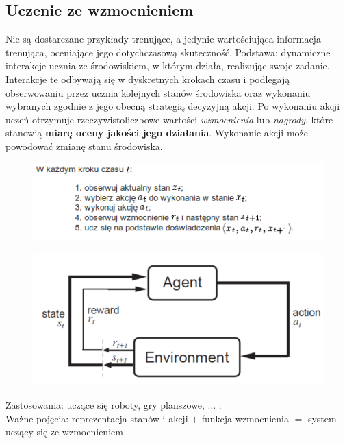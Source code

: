 \documentclass[10pt,a4paper]{article}
\begin{document}
\subsection{Uczenie ze wzmocnieniem}
Nie są dostarczane przykłady trenujące, a jedynie wartościująca informacja trenująca, oceniające jego dotychczasową skuteczność. Podstawa: dynamiczne interakcje ucznia ze środowiskiem, w którym działa, realizując swoje zadanie. Interakcje te odbywają się w dyskretnych krokach czasu i podlegają obserwowaniu przez ucznia kolejnych stanów środowiska oraz wykonaniu wybranych zgodnie z jego obecną strategią decyzyjną akcji. Po wykonaniu akcji uczeń otrzymuje rzeczywistoliczbowe wartości \textit{wzmocnienia} lub \textit{nagrody}, które stanowią \textbf{miarę oceny jakości jego działania}. Wykonanie akcji może powodować zmianę stanu środowiska.
\begin{figure}[H]
  \centering
    \includegraphics[scale=0.70]{images/wzm.png}
\end{figure}
\begin{figure}[H]
  \centering
    \includegraphics[scale=0.50]{images/wzm2.png}
\end{figure}
Zastosowania: uczące się roboty, gry planszowe, ... . \\ Ważne pojęcia: reprezentacja stanów i akcji $+$ funkcja wzmocnienia $=$ system uczący się ze wzmocnieniem
\end{document}
